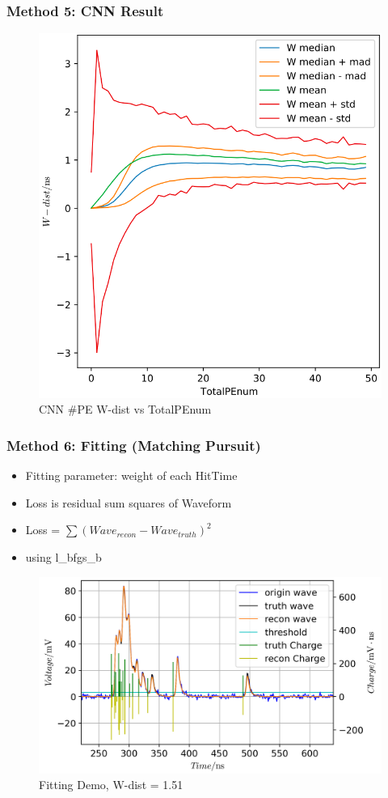 \documentclass{beamer}
\begin{document}
\begin{frame}
\frametitle{Method 5: CNN Result}
\setlength{\abovecaptionskip}{0mm}
\setlength{\belowcaptionskip}{0mm}
\begin{figure}
    \centering
    \caption{CNN \#PE W-dist vs TotalPEnum}
    \includegraphics[width=0.65\linewidth]{img/takarapenumstats.png}
\end{figure}
\end{frame}

\begin{frame}
\frametitle{Method 6: Fitting (Matching Pursuit)}
\begin{itemize}
    \item Fitting parameter: weight of each HitTime
    \item Loss is residual sum squares of Waveform
    \item Loss = $\sum(Wave_{recon}-Wave_{truth})^{2}$
    \item using l\_bfgs\_b
\end{itemize}
\setlength{\abovecaptionskip}{0mm}
\setlength{\belowcaptionskip}{0mm}
\begin{figure}
    \centering
    \caption{Fitting Demo, W-dist = 1.51}
    \includegraphics[width=0.85\linewidth]{img/demo.png}
\end{figure}
\end{frame}
\end{document}
